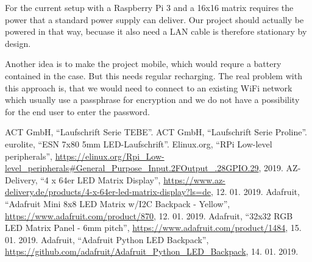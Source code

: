 \documentclass[conference]{IEEEtran}
\begin{document}
For the current setup with a Raspberry Pi 3 and a 16x16 matrix requires the power that a standard power supply can deliver. Our project should actually be powered in that way, becuase it also need a LAN cable is therefore stationary by design.

Another idea is to make the project mobile, which would requre a battery contained in the case. But this needs regular recharging. The real problem with this approach is, that we would need to connect to an existing WiFi network which usually use a passphrase for encryption and we do not have a possibility for the end user to enter the password.


\begin{thebibliography}{00}
  ACT GmbH,
  ``Laufschrift Serie TEBE''.
  ACT GmbH,
  ``Laufschrift Serie Proline''.
  eurolite,
  ``ESN 7x80 5mm LED-Laufschrift''.
  Elinux.org,
  ``RPi Low-level peripherals'',
  \url{https://elinux.org/Rpi_Low-level_peripherals#General_Purpose_Input.2FOutput_.28GPIO.29},
  2019.
  AZ-Delivery,
  ``4 x 64er LED Matrix Display'',
  \url{https://www.az-delivery.de/products/4-x-64er-led-matrix-display?ls=de},
  12. 01. 2019.
  Adafruit,
  ``Adafruit Mini 8x8 LED Matrix w/I2C Backpack - Yellow'',
  \url{https://www.adafruit.com/product/870},
  12. 01. 2019.
  Adafruit,
  ``32x32 RGB LED Matrix Panel - 6mm pitch'',
  \url{https://www.adafruit.com/product/1484},
  15. 01. 2019.
  Adafruit,
  ``Adafruit Python LED Backpack'',
  \url{https://github.com/adafruit/Adafruit_Python_LED_Backpack},
  14. 01. 2019.
\end{thebibliography}
\end{document}
